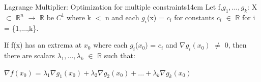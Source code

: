     \begin{wtheorem}{Lagrange Multiplier: Optimization for multiple constraints}{14cm}
        Let f,$g_1,...,g_k$: X $\subset$ $\mathbb{R}^n$ $\rightarrow$ $\mathbb{R}$
        be $C^1$ where k $<$ n and each $g_i$(x) = $c_i$ for constants
        $c_i$ $\in$ $\mathbb{R}$ for i = \{1,...,k\}.
        
        If f(x) has an extrema at $x_0$ where each $g_i$($x_0$) = $c_i$ and
        $\nabla g_i(x_0)$ $\not =$ 0, then there are scalars
        $\lambda_1,...,\lambda_k$ $\in$ $\mathbb{R}$ such that:

        \hspace{0.5cm}
        $\nabla f(x_0)$ = $\lambda_1 \nabla g_1(x_0)
                            + \lambda_2 \nabla g_2(x_0)
                            + ... + \lambda_k \nabla g_k(x_0)$
    \end{wtheorem}





























